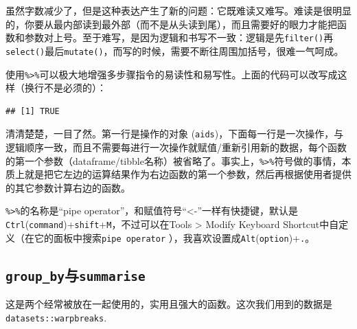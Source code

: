 \documentclass[]{book}
\newenvironment{Shaded}{\begin{snugshade}}{\end{snugshade}}
\newcommand{\CommentTok}[1]{\textcolor[rgb]{0.56,0.35,0.01}{\textit{#1}}}
\newcommand{\DataTypeTok}[1]{\textcolor[rgb]{0.13,0.29,0.53}{#1}}
\newcommand{\KeywordTok}[1]{\textcolor[rgb]{0.13,0.29,0.53}{\textbf{#1}}}
\newcommand{\NormalTok}[1]{#1}
\newcommand{\OperatorTok}[1]{\textcolor[rgb]{0.81,0.36,0.00}{\textbf{#1}}}
\newcommand{\StringTok}[1]{\textcolor[rgb]{0.31,0.60,0.02}{#1}}
\begin{document}
虽然字数减少了，但是这种表达产生了新的问题：它既难读又难写。难读是很明显的，你要从最内部读到最外部（而不是从头读到尾），而且需要好的眼力才能把函数和参数对上号。至于难写，是因为逻辑和书写不一致：逻辑是先\texttt{filter()}再\texttt{select()}最后\texttt{mutate()}，而写的时候，需要不断往周围加括号，很难一气呵成。

使用\texttt{\%\textgreater{}\%}可以极大地增强多步骤指令的易读性和易写性。上面的代码可以改写成这样（换行不是必须的）：

\begin{Shaded}
\end{Shaded}

\begin{verbatim}
## [1] TRUE
\end{verbatim}

清清楚楚，一目了然。第一行是操作的对象 (\texttt{aids})，下面每一行是一次操作，与逻辑顺序一致，而且不需要每进行一次操作就赋值/重新引用新的数据，每个函数的第一个参数（dataframe/tibble名称）被省略了。事实上，\texttt{\%\textgreater{}\%}符号做的事情，本质上就是把它左边的运算结果作为右边函数的第一个参数，然后再根据使用者提供的其它参数计算右边的函数。

\texttt{\%\textgreater{}\%}的名称是``pipe operator''，和赋值符号``\textless{}-''一样有快捷键，默认是\texttt{Ctrl}(\texttt{command})+\texttt{shift}+\texttt{M}，不过可以在Tools \textgreater{} Modify Keyboard Shortcut中自定义（在它的面板中搜索\texttt{pipe\ operator} ），我喜欢设置成\texttt{Alt}(\texttt{option})+\texttt{.}。

\hypertarget{group_bysummarise}{%
\subsection{\texorpdfstring{\texttt{group\_by}与\texttt{summarise}}{group\_by与summarise}}\label{group_bysummarise}}

这是两个经常被放在一起使用的，实用且强大的函数。这次我们用到的数据是\texttt{datasets::warpbreaks}.
\end{document}
